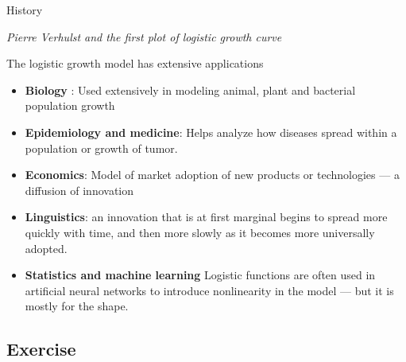 \begin{frame}{History}
\begin{center}
           \textit{Pierre Verhulst and the first plot of logistic growth curve}
    \end{center}
\end{frame}

\begin{frame}{The logistic growth model has extensive applications}

\begin{itemize}
    \item \textbf{Biology} : Used extensively in modeling animal, plant and bacterial population growth
    \pause
    \item \textbf{Epidemiology and medicine}: Helps analyze how diseases spread within a population or growth of tumor.
    \pause
    \item \textbf{Economics}: Model of market adoption of new products or technologies --- a diffusion of innovation
    \pause
    \item \textbf{Linguistics}: an innovation that is at first marginal begins to spread more quickly with time, and then more slowly as it becomes more universally adopted.
    \pause
    \item \textbf{Statistics and machine learning} Logistic functions are often used in artificial neural networks to introduce nonlinearity in the model --- but it is mostly for the shape. 
\end{itemize}

\end{frame}

\subsection{Exercise}



